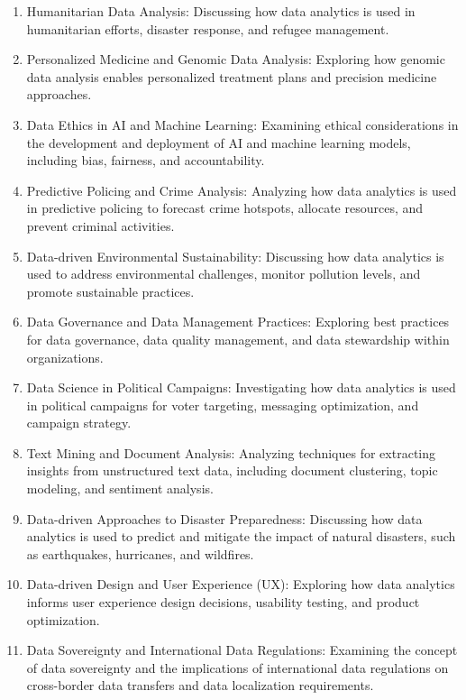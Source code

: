 \documentclass[12pt]{article}
\begin{document}
\begin{enumerate}
        \item Humanitarian Data Analysis: Discussing how data analytics is used in humanitarian efforts, disaster response, and refugee management.
        \item Personalized Medicine and Genomic Data Analysis: Exploring how genomic data analysis enables personalized treatment plans and precision medicine approaches.
        \item Data Ethics in AI and Machine Learning: Examining ethical considerations in the development and deployment of AI and machine learning models, including bias, fairness, and accountability.
        \item Predictive Policing and Crime Analysis: Analyzing how data analytics is used in predictive policing to forecast crime hotspots, allocate resources, and prevent criminal activities.
        \item Data-driven Environmental Sustainability: Discussing how data analytics is used to address environmental challenges, monitor pollution levels, and promote sustainable practices.
        \item Data Governance and Data Management Practices: Exploring best practices for data governance, data quality management, and data stewardship within organizations.
        \item Data Science in Political Campaigns: Investigating how data analytics is used in political campaigns for voter targeting, messaging optimization, and campaign strategy.
        \item Text Mining and Document Analysis: Analyzing techniques for extracting insights from unstructured text data, including document clustering, topic modeling, and sentiment analysis.
        \item Data-driven Approaches to Disaster Preparedness: Discussing how data analytics is used to predict and mitigate the impact of natural disasters, such as earthquakes, hurricanes, and wildfires.
        \item Data-driven Design and User Experience (UX): Exploring how data analytics informs user experience design decisions, usability testing, and product optimization.
        \item Data Sovereignty and International Data Regulations: Examining the concept of data sovereignty and the implications of international data regulations on cross-border data transfers and data localization requirements.
    \end{enumerate}
\end{document}
